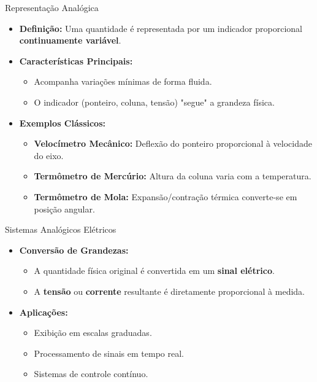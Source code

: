 \begin{frame}{Representação Analógica}
    \begin{itemize}
        \item \textbf{Definição:} Uma quantidade é representada por um indicador proporcional \textbf{continuamente variável}.
        \item \textbf{Características Principais:}
              \begin{itemize}
                  \item Acompanha variações mínimas de forma fluida.
                  \item O indicador (ponteiro, coluna, tensão) "segue" a grandeza física.
              \end{itemize}
        \item \textbf{Exemplos Clássicos:}
              \begin{itemize}
                  \item \textbf{Velocímetro Mecânico:} Deflexão do ponteiro proporcional à velocidade do eixo.
                  \item \textbf{Termômetro de Mercúrio:} Altura da coluna varia com a temperatura.
                  \item \textbf{Termômetro de Mola:} Expansão/contração térmica converte-se em posição angular.
              \end{itemize}
    \end{itemize}
\end{frame}

\begin{frame}{Sistemas Analógicos Elétricos}
    \begin{itemize}
        \item \textbf{Conversão de Grandezas:}
              \begin{itemize}
                  \item A quantidade física original é convertida em um \textbf{sinal elétrico}.
                  \item A \textbf{tensão} ou \textbf{corrente} resultante é diretamente proporcional à medida.
              \end{itemize}
        \item \textbf{Aplicações:}
              \begin{itemize}
                  \item Exibição em escalas graduadas.
                  \item Processamento de sinais em tempo real.
                  \item Sistemas de controle contínuo.
              \end{itemize}
    \end{itemize}
    \vspace{0.3cm}

\end{frame}

